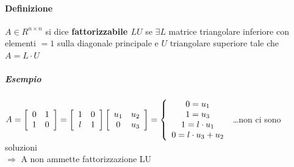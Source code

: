 \documentclass[10pt]{book}
\begin{document}
\paragraph{Definizione} $A \in R^{n \times n}$ si dice \textbf{fattorizzabile $LU$} se $\exists L$ matrice triangolare inferiore con elementi $= 1$ sulla diagonale principale e $U$ triangolare superiore tale che $A = L\cdot U$
\subparagraph{Esempio} \begin{math}
A = \left[
\begin{array}{c c}
	0 & 1\\
	1 & 0
\end{array}
\right]
= \left[
\begin{array}{c c}
	1 & 0\\
	l & 1
\end{array}
\right]
\left[
\begin{array}{c c}
	u_1 & u_2\\
	0 & u_3
\end{array}
\right]
= \left\{
\begin{array}{c}
	0 = u_1\\
	1 = u_3\\
	1 = l\cdot u_1\\
	0 = l\cdot u_3 + u_2
\end{array}
\right.
\end{math}
\ldots non ci sono soluzioni\\
$\Rightarrow$ A non ammette fattorizzazione LU
\pagebreak
\end{document}
